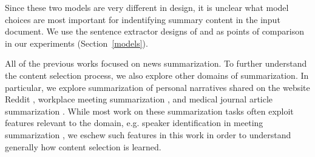 Since these two models are very different in design, it is unclear 
what model choices are most important for indentifying summary content 
in the input document. We use the sentence extractor designs of 
\citep{cheng2016neural} and \citep{nallapati2017summarunner} as points of 
comparison in our experiments 
(Section~\ref{models}).

All of the previous works 
focused on news summarization. To further
understand the content selection process, we also explore other domains 
of summarization. In particular, we explore 
summarization of personal narratives shared
on the website Reddit \cite{ouyang2017crowd}, workplace meeting summarization
\cite{carletta2005ami}, and medical journal article summarization 
\cite{mishra2014text}. While most work on these summarization tasks
 often exploit 
features relevant
to the domain, e.g. speaker identification in meeting summarization \cite{gillick2009global},
we eschew such features in this work in order to understand generally how 
content
selection is learned.










%
%
%
%



